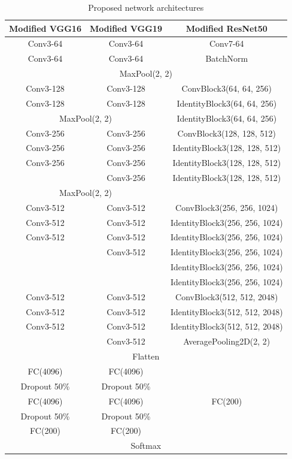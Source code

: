 \documentclass[10pt,twocolumn,letterpaper]{article}
\begin{document}
\begin{table}[t]
	\caption{Proposed network architectures}
	\label{tab:network}
	\centering
	\begin{tabular}{c|c|c}
		\hline
		\textbf{Modified VGG16} & \textbf{Modified VGG19} & \textbf{Modified ResNet50} \\
		\hline
		Conv3-64 & Conv3-64 & Conv7-64 \\
		Conv3-64 & Conv3-64 & BatchNorm \\
		\hline
		\multicolumn{3}{c}{MaxPool(2, 2)} \\
		\hline
		Conv3-128 & Conv3-128 & ConvBlock3(64, 64, 256) \\
		Conv3-128 & Conv3-128 & IdentityBlock3(64, 64, 256) \\
		\hline
		\multicolumn{2}{c|}{MaxPool(2, 2)} & IdentityBlock3(64, 64, 256) \\
		\hline
		Conv3-256 & Conv3-256 & ConvBlock3(128, 128, 512) \\
		Conv3-256 & Conv3-256 & IdentityBlock3(128, 128, 512) \\
		Conv3-256 & Conv3-256 & IdentityBlock3(128, 128, 512) \\
		& Conv3-256 & IdentityBlock3(128, 128, 512) \\
		\hline
		\multicolumn{2}{c|}{MaxPool(2, 2)} & \\
		\hline
		Conv3-512 & Conv3-512 & ConvBlock3(256, 256, 1024) \\
		Conv3-512 & Conv3-512 & IdentityBlock3(256, 256, 1024) \\
		Conv3-512 & Conv3-512 & IdentityBlock3(256, 256, 1024) \\
		& Conv3-512 & IdentityBlock3(256, 256, 1024) \\
		&  & IdentityBlock3(256, 256, 1024) \\
		&  & IdentityBlock3(256, 256, 1024) \\
		\hline
		Conv3-512 & Conv3-512 & ConvBlock3(512, 512, 2048) \\
		Conv3-512 & Conv3-512 & IdentityBlock3(512, 512, 2048) \\
		Conv3-512 & Conv3-512 & IdentityBlock3(512, 512, 2048) \\
		& Conv3-512 & AveragePooling2D(2, 2) \\
		\hline
		\multicolumn{3}{c}{Flatten} \\
		\hline
		FC(4096) & FC(4096) & \multirow{5}{*}{FC(200)} \\
		Dropout 50\% & Dropout 50\%  & \\
		FC(4096) & FC(4096) & \\
		Dropout 50\% & Dropout 50\%  & \\
		FC(200) & FC(200) & \\
		\hline
		\multicolumn{3}{c}{Softmax} \\
		\hline	
	\end{tabular}
\end{table}
\end{document}
